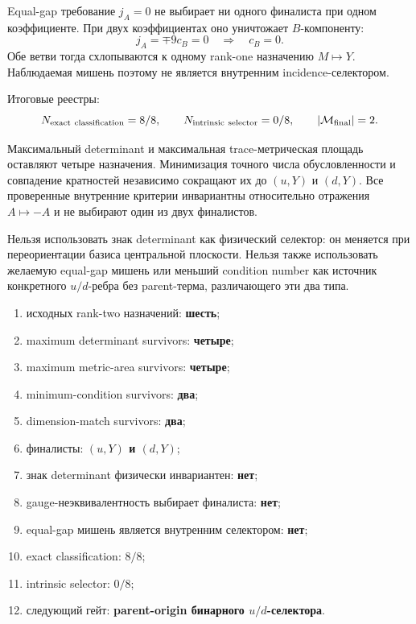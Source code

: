 Equal-gap требование $j_A=0$ не выбирает ни одного финалиста при одном
коэффициенте. При двух коэффициентах оно уничтожает $B$-компоненту:
\begin{equation}
 j_A=\mp9c_B=0\quad\Longrightarrow\quad c_B=0.
 \label{eq:v8-cubic-incidence-selector-equal-gap-ratio}
\end{equation}
Обе ветви тогда схлопываются к одному rank-one назначению $M\mapsto Y$.
Наблюдаемая мишень поэтому не является внутренним incidence-селектором.

Итоговые реестры:
\begin{equation}
 N_{\rm exact\ classification}=8/8,
 \qquad N_{\rm intrinsic\ selector}=0/8,
 \qquad |\mathcal M_{\rm final}|=2.
 \label{eq:v8-cubic-incidence-selector-ledgers}
\end{equation}

\begin{theorem}
Максимальный determinant и максимальная trace-метрическая площадь оставляют
четыре назначения. Минимизация точного числа обусловленности и совпадение
кратностей независимо сокращают их до $(u,Y)$ и $(d,Y)$. Все проверенные
внутренние критерии инвариантны относительно отражения $A\mapsto-A$ и не
выбирают один из двух финалистов.
\end{theorem}

\begin{nogocriterion}
Нельзя использовать знак determinant как физический селектор: он меняется
при переориентации базиса центральной плоскости. Нельзя также использовать
желаемую equal-gap мишень или меньший condition number как источник
конкретного $u/d$-ребра без parent-терма, различающего эти два типа.
\end{nogocriterion}

\begin{protocol}\begin{enumerate}
\item исходных rank-two назначений: \textbf{шесть};
\item maximum determinant survivors: \textbf{четыре};
\item maximum metric-area survivors: \textbf{четыре};
\item minimum-condition survivors: \textbf{два};
\item dimension-match survivors: \textbf{два};
\item финалисты: \textbf{$(u,Y)$ и $(d,Y)$};
\item знак determinant физически инвариантен: \textbf{нет};
\item gauge-неэквивалентность выбирает финалиста: \textbf{нет};
\item equal-gap мишень является внутренним селектором: \textbf{нет};
\item exact classification: \textbf{$8/8$};
\item intrinsic selector: \textbf{$0/8$};
\item следующий гейт: \textbf{parent-origin бинарного $u/d$-селектора}.
\end{enumerate}\end{protocol}

